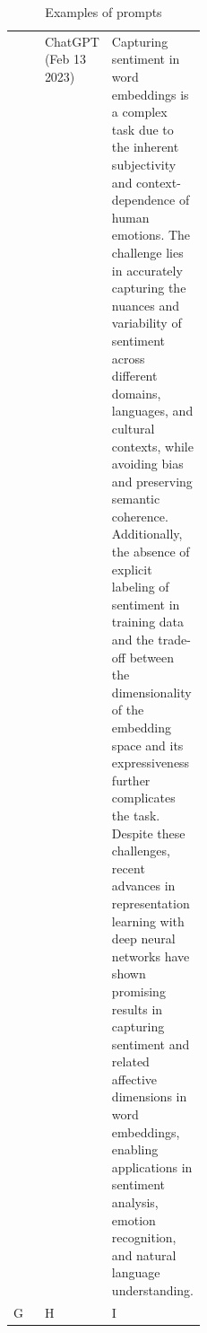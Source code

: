 \documentclass[11pt, a4paper]{amsart}
\begin{document}
\begin{table}[h]
\begin{tabularx}{\textwidth}{ p{0.25\linewidth} p{1.5cm} X }
		& ChatGPT (Feb 13 2023)
		& Capturing sentiment in word embeddings is a complex task due to the inherent subjectivity and context-dependence of human emotions. The challenge lies in accurately capturing the nuances and variability of sentiment across different domains, languages, and cultural contexts, while avoiding bias and preserving semantic coherence. Additionally, the absence of explicit labeling of sentiment in training data and the trade-off between the dimensionality of the embedding space and its expressiveness further complicates the task. Despite these challenges, recent advances in representation learning with deep neural networks have shown promising results in capturing sentiment and related affective dimensions in word embeddings, enabling applications in sentiment analysis, emotion recognition, and natural language understanding.     \\ 
		G    & H      & I     \\ 
		\bottomrule
	\end{tabularx}
	\caption{Examples of prompts}
	\label{table:examples_of_prompts}
\end{table}
\end{document}
